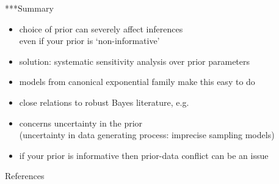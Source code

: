 \documentclass{beamer}
\begin{document}
\begin{frame}{***Summary}
  \begin{itemize}%
  \item choice of prior can severely affect inferences \\
    even if your prior is `non-informative'
  \item solution: systematic sensitivity analysis over prior parameters
  \item models from canonical exponential family make this easy to do
  \item close relations to robust Bayes literature, e.g.\ %
  \item concerns uncertainty in the prior\\
    (uncertainty in data generating process: imprecise sampling models)
  \item if your prior is informative then prior-data conflict can be an issue
  \end{itemize}
\end{frame}

\begin{frame}[allowframebreaks]{References}
%
%  
%   
\printbibliography[heading=none]
\end{frame}
\end{document}
